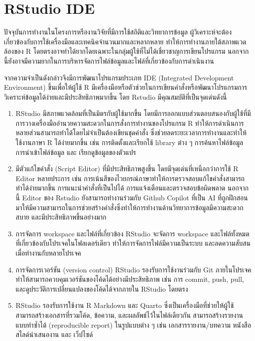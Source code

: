 \documentclass[
  a4paper,
]{book}
\begin{document}
\section{RStudio IDE}\label{rstudio-ide}

ปัจจุบันการทำงานในโครงการหรืองานวิจัยที่มีการใช้สถิติและวิทยาการข้อมูล
ผู้วิเคราะห์จะต้องเกี่ยวข้องกับการใช้เครื่องมือและเทคนิคจำนวนมากและหลากหลาย
ทำให้การทำงานภายใต้สภาพแวดล้องของ R
โดยตรงอาจทำได้ยากโดยเฉพาะในกลุ่มผู้ใช้ที่ไม่ได้เชี่ยวชาญการเขียนโปรแกรม
นอกจากนี้ยังอาจมีความยากในการบริหารจัดการไฟล์ข้อมูลและไฟล์ที่เกี่ยวข้องกับการดำเนินงาน

จากความจำเป็นดังกล่าวจึงมีการพัฒนาโปรแกรมประเภท IDE (Integrated Development
Environment) ขึ้นเพื่อให้ผู้ใช้ R
มีเครื่องมือหรือตัวช่วยในการเขียนคำสั่งหรือพัฒนาโปรแกรมการวิเคราะห์ข้อมูลได้ง่ายและมีประสิทธิภาพมากขึ้น
โดย Rstudio มีคุณสมบัติที่เป็นจุดเด่นดังนี้

\begin{enumerate}
\def\labelenumi{\arabic{enumi}.}
\item
  RStudio มีสภาพแวดล้อมที่เป็นมิตรกับผู้ใช้มากขึ้น
  โดยมีการออกแบบส่วนตอบสนองกับผู้ใช้ที่มีการวางเครื่องมืออำนวยความสะดวกในการสั่งการทำงานของโปรแกรม
  R ทำให้การดำเนินการหลายส่วนสามารถทำได้โดยไม่จำเป็นต้องเขียนชุดคำสั่ง
  ซึ่งช่วยลดระยะเวลาการทำงานและทำให้ใช้งานภาษา R ได้ง่ายมากขึ้น เช่น
  การติดตั้งและเรียกใช้ library ต่าง ๆ การค้นหาไฟล์ข้อมูล การนำเข้าไฟล์ข้อมูล และ
  เรียกดูข้อมูลของตัวแปร
\item
  มีตัวแก้ไขคำสั่ง (Script Editor) ที่มีประสิทธิภาพสูงขึ้น โดยมีจุดเด่นที่เหนือกว่าการใช้ R
  Editor หลายประการ เช่น
  การเน้นสีของไวยกรณ์ภาษาทำให้การตรวจสอบแก้ไขคำสั่งสามารถทำได้ง่ายมากขึ้น
  การแนะนำคำสั่งที่เป็นไปได้ การแแจ้งเตือนและตรวจสอบข้อผิดพลาด นอกจากนี้ Editor ของ
  Rstudio ยังสามารถทำงานร่วมกับ Github Copilot ที่เป็น AI
  ที่ถูกฝึกสอนมาให้มีความสามารถในการช่วยสร้างคำสั่งซึ่งทำให้การทำงานด้านวิทยาการข้อมูลมีความสะดวกสบาย
  และมีประสิทธิภาพขึ้นอย่างมาก
\item
  การจัดการ workspace และไฟล์ที่เกี่ยวข้อง RStudio จะจัดการ workspace
  และไฟล์ทั้งหมดที่เกี่ยวข้องกับโปรเจคในโฟลเดอร์เดียว ทำให้การจัดการไฟล์มีความเป็นระบบ
  และลดความสับสนเมื่อทำงานกับหลายโปรเจค
\item
  การจัดการเวอร์ชัน (version control) RStudio รองรับการใช้งานร่วมกับ Git
  ภายในโปรเจค ทำให้สามารถควบคุมเวอร์ชันของโค้ดได้อย่างมีประสิทธิภาพ เช่น การ
  commit, push, pull, และดูประวัติการเปลี่ยนแปลงของโค้ดได้จากภายใน RStudio
  โดยตรง
\item
  RStudio รองรับการใช้งาน R Markdown และ Quarto
  ซึ่งเป็นเครื่องมือที่ช่วยให้ผู้ใช้สามารถสร้างเอกสารที่รวมโค้ด, ข้อความ,
  และผลลัพธ์ไว้ในไฟล์เดียวกัน สามารถสร้างรายงานแบบทำซ้ำได้ (reproducible report)
  ในรูปแบบต่าง ๆ เช่น เอกสารรายงาน/บทความ หนังสือ สไลด์นำเสนองาน และ เว็ปไซด์
\end{enumerate}
\end{document}
